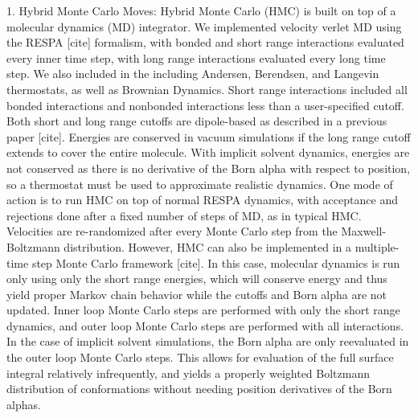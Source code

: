 1.
Hybrid Monte Carlo Moves: Hybrid Monte Carlo (HMC) is built on top of a molecular dynamics (MD) integrator.
We implemented velocity verlet MD using the RESPA [cite] formalism, with bonded and short range interactions evaluated every inner time step, with long range interactions evaluated every long time step.
We also included in the including Andersen, Berendsen, and Langevin thermostats, as well as Brownian Dynamics.
Short range interactions included all bonded interactions and nonbonded interactions less than a user-specified cutoff.
Both short and long range cutoffs are dipole-based as described in a previous paper [cite].
Energies are conserved in vacuum simulations if the long range cutoff extends to cover the entire molecule.
With implicit solvent dynamics, energies are not conserved as there is no derivative of the Born alpha with respect to position, so a thermostat must be used to approximate realistic dynamics.
One mode of action is to run HMC on top of normal RESPA dynamics, with acceptance and rejections done after a fixed number of steps of MD, as in typical HMC.
Velocities are re-randomized after every Monte Carlo step from the Maxwell-Boltzmann distribution.
However, HMC can also be implemented in a multiple-time step Monte Carlo framework [cite].
In this case, molecular dynamics is run only using only the short range energies, which will conserve energy and thus yield proper Markov chain behavior while the cutoffs and Born alpha are not updated.
Inner loop Monte Carlo steps are performed with only the short range dynamics, and outer loop Monte Carlo steps are performed with all interactions.
In the case of implicit solvent simulations, the Born alpha are only reevaluated in the outer loop Monte Carlo steps.
This allows for evaluation of the full surface integral relatively infrequently, and yields a properly weighted Boltzmann distribution of conformations without needing position derivatives of the Born alphas.

